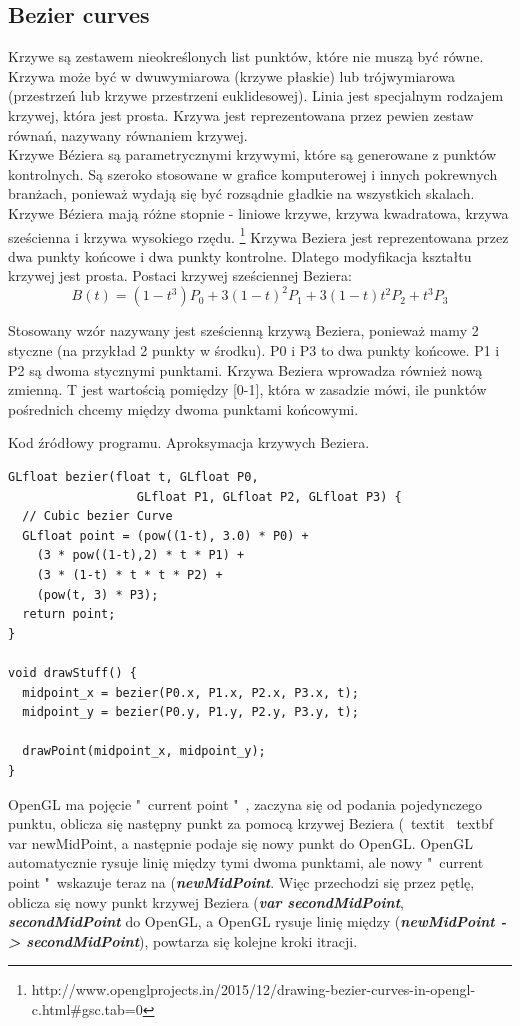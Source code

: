 \subsection{Bezier curves}
Krzywe są zestawem nieokreślonych list punktów, które nie muszą być równe. Krzywa może być w dwuwymiarowa (krzywe płaskie) lub trójwymiarowa (przestrzeń lub krzywe przestrzeni euklidesowej). Linia jest specjalnym rodzajem krzywej, która jest prosta. Krzywa jest reprezentowana przez pewien zestaw równań, nazywany równaniem krzywej.\\
Krzywe Béziera są parametrycznymi krzywymi, które są generowane z punktów kontrolnych. Są szeroko stosowane w grafice komputerowej i innych pokrewnych branżach, ponieważ wydają się być rozsądnie gładkie na wszystkich skalach. Krzywe Béziera mają różne stopnie - liniowe krzywe, krzywa kwadratowa, krzywa sześcienna i krzywa wysokiego rzędu. \footnote{http://www.openglprojects.in/2015/12/drawing-bezier-curves-in-opengl-c.html\#gsc.tab=0}
Krzywa Beziera jest reprezentowana przez dwa punkty końcowe i dwa punkty kontrolne. Dlatego modyfikacja kształtu krzywej jest prosta. Postaci krzywej sześciennej Beziera:
\begin{equation}
B(t)=(1-t^{3})P_{0}+3(1-t)^{2}P_{1}+3(1-t)t^{2}P_{2}+t^{3}P_{3} 
\end{equation}

Stosowany wzór nazywany jest sześcienną krzywą Beziera, ponieważ mamy 2 styczne (na przykład 2 punkty w środku). P0 i P3 to dwa punkty końcowe. P1 i P2 są dwoma stycznymi punktami. Krzywa Beziera wprowadza również nową zmienną. T jest wartością pomiędzy [0-1], która w zasadzie mówi, ile punktów pośrednich chcemy między dwoma punktami końcowymi.
\begin{table}[H]
\caption{Kod źródłowy programu. Aproksymacja krzywych Beziera.}
\label{tab2}
\begin{lstlisting}[frame=single]
GLfloat bezier(float t, GLfloat P0,
                  GLfloat P1, GLfloat P2, GLfloat P3) {
  // Cubic bezier Curve
  GLfloat point = (pow((1-t), 3.0) * P0) +
    (3 * pow((1-t),2) * t * P1) +
    (3 * (1-t) * t * t * P2) +
    (pow(t, 3) * P3);
  return point;
}

void drawStuff() {
  midpoint_x = bezier(P0.x, P1.x, P2.x, P3.x, t);
  midpoint_y = bezier(P0.y, P1.y, P2.y, P3.y, t);

  drawPoint(midpoint_x, midpoint_y);
}
\end{lstlisting}
\end{table}

OpenGL ma pojęcie "\ current point "\ , zaczyna się od podania pojedynczego punktu, oblicza się następny punkt za pomocą krzywej Beziera (\ textit {\ textbf {var newMidPoint}}, a następnie podaje się nowy punkt do OpenGL. OpenGL automatycznie rysuje linię między tymi dwoma punktami, ale nowy "\ current point "\ wskazuje teraz na (\textit {\textbf {newMidPoint}}. Więc przechodzi się przez pętlę, oblicza się nowy punkt krzywej Beziera (\textit {\textbf {var secondMidPoint}}, \textit {\textbf {secondMidPoint}} do OpenGL, a OpenGL rysuje linię między (\textit {\textbf {newMidPoint -> secondMidPoint}}), powtarza się kolejne kroki itracji.

